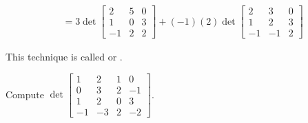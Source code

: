 \begin{applicationActivities}
\begin{observation}
\begin{align*}
&= 3 \det \begin{bmatrix}2 & 5 & 0 \\ 1 & 0 & 3 \\ -1 & 2 & 2 \end{bmatrix} +(-1)(2) \det \begin{bmatrix} 2 & 3 & 0 \\ 1 & 2 & 3 \\ -1 & -1 & 2 \end{bmatrix}
\end{align*}

This technique is called  or .
  \end{observation}

\begin{activity}{10}
  Compute  $\det \begin{bmatrix} 1 & 2 & 1 & 0 \\ 0 & 3 & 2 & -1 \\ 1 & 2 & 0 & 3 \\ -1 & -3 & 2 & -2 \end{bmatrix}$.

\end{activity}


\end{applicationActivities}
